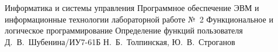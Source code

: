 \documentclass{bmstu}
\begin{document}
	\makereporttitle
	{Информатика и системы управления} %
	{Программное обеспечение ЭВМ и информационные технологии} %
	{лабораторной работе №~2} %
	{Функциональное и логическое программирование} %
	{Определение функций пользователя} %
	{} %
	{Д.~В.~Шубенина/ИУ7-61Б} %
	{Н.~Б.~Толпинская, Ю.~В.~Строганов} %
	\maketableofcontents
	
\end{document}
